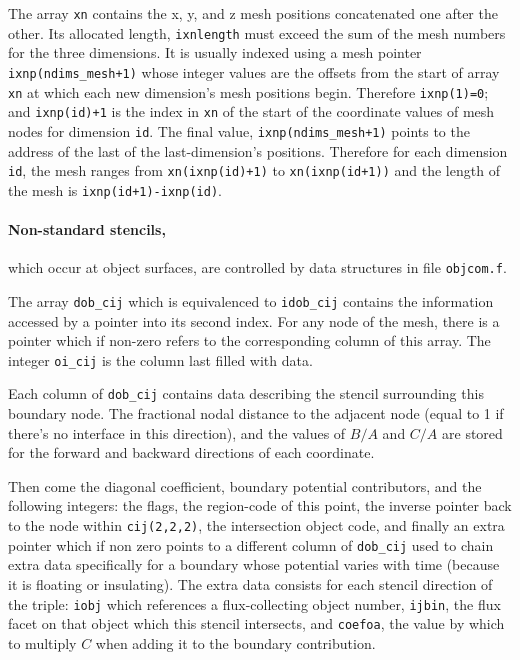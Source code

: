 \documentclass[12pt]{article}
\begin{document}
The array \verb!xn! contains the x, y, and z mesh positions
concatenated one after the other. Its allocated length,
\verb!ixnlength! must exceed the sum of the mesh numbers for the three
dimensions. It is usually indexed using a mesh pointer
\verb!ixnp(ndims_mesh+1)! whose integer values are the offsets from
the start of array \verb!xn! at which each new dimension's mesh
positions begin. Therefore \verb!ixnp(1)=0!; and \verb!ixnp(id)+1! is
the index in \verb!xn! of the start of the coordinate values of mesh nodes
for dimension \verb!id!. The final value, \verb!ixnp(ndims_mesh+1)!
points to the address of the last of the last-dimension's
positions. Therefore for each dimension \verb!id!, the mesh ranges
from \verb!xn(ixnp(id)+1)!  to \verb!xn(ixnp(id+1))!  and the length
of the mesh is \verb!ixnp(id+1)-ixnp(id)!.

\paragraph{Non-standard stencils,} which occur at object surfaces,
are controlled by data structures in file \verb!objcom.f!. 

The array \verb!dob_cij! which is equivalenced to \verb!idob_cij!
contains the information accessed by a pointer into its second index.
For any node of the mesh, there is a pointer which if non-zero refers
to the corresponding column of this array. The integer
\verb!oi_cij! is the column last filled with data. 

Each column of \verb!dob_cij! contains data describing the stencil
surrounding this boundary node. The fractional nodal distance to the
adjacent node (equal to 1 if there's no interface in this direction), and the
values of $B/A$ and $C/A$ are stored for the forward and backward
directions of each coordinate. 

Then come the diagonal coefficient, boundary potential contributors,
and the following integers: the flags, the region-code of this point,
the inverse pointer back to the node within \verb!cij(2,2,2)!, the
intersection object code, and finally an extra pointer which if non
zero points to a different column of \verb!dob_cij! used to chain
extra data specifically for a boundary whose potential varies with
time (because it is floating or insulating). The extra data consists
for each stencil direction of the triple: \verb!iobj! which references a
flux-collecting object number, \verb!ijbin!, the flux facet on that
object which this stencil intersects, and \verb!coefoa!, the value by
which to multiply $C$ when adding it to the boundary contribution.
\end{document}
